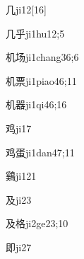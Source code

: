 
\begin{verbete}{几}{ji1}{2}[16]
\end{verbete}

\begin{verbete}{几乎}{ji1hu1}{2;5}
\end{verbete}

\begin{verbete}{机场}{ji1chang3}{6;6}
\end{verbete}

\begin{verbete}{机票}{ji1piao4}{6;11}
\end{verbete}

\begin{verbete}{机器}{ji1qi4}{6;16}
\end{verbete}

\begin{verbete}{鸡}{ji1}{7}
\end{verbete}

\begin{verbete}{鸡蛋}{ji1dan4}{7;11}
\end{verbete}

\begin{verbete}{鷄}{ji1}{21}
\end{verbete}

\begin{verbete}{及}{ji2}{3}
\end{verbete}

\begin{verbete}{及格}{ji2ge2}{3;10}
\end{verbete}

\begin{verbete}{即}{ji2}{7}
\end{verbete}

